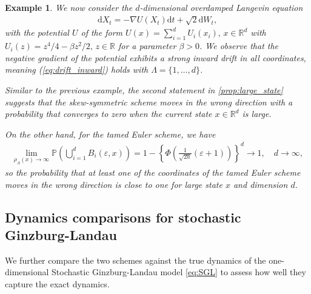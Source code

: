\documentclass[11pt]{article}
\newtheorem{example}{Example}
\renewcommand{\d}{\mathrm{d}}
\begin{document}
\begin{example}
We now consider the $d$-dimensional \emph{overdamped Langevin equation}
% 
\begin{align*}
\d X_t = - \nabla U (X_t) \d t + \sqrt{2} \d W_t,  
\end{align*}
% 
with the potential $U$ of the form $U(x) = \sum_{i = 1}^d U_i (x_i), \, x \in \mathbb{R}^d$ with $U_i (z) = z^4/4 - \beta z^2/2, \, z \in \mathbb{R}$ for a parameter $\beta > 0$. We observe that the negative gradient of the potential exhibits a strong inward drift in all coordinates, meaning (\ref{eq:drift_inward}) holds with $\Lambda = \{1, \ldots, d\}$. 

Similar to the previous example, the second statement in \cref{prop:large_state} suggests that the skew-symmetric scheme moves in the wrong direction with a probability that converges to zero when the current state $x \in \mathbb{R}^d$ is large. 

On the other hand, for the tamed Euler scheme, we have
% 
\begin{align*}
\lim_{\rho_\Lambda (x) \to \infty} \mathbb{P} \left( \bigcup_{i = 1}^d B_i  (\varepsilon, x) \right) = 1 - \left\{ \Phi \left( \frac{1}{\sqrt{2 h}} (\varepsilon + 1) \right) \right\}^d \to 1, \quad d \to \infty, 
\end{align*} 
% 
so the probability that at least one of the coordinates of the tamed Euler scheme moves in the wrong direction is close to one for large state $x$ and dimension $d$. 
\end{example}

\subsection{Dynamics comparisons for stochastic Ginzburg-Landau} 

We further compare the two schemes against the true dynamics of the one-dimensional Stochastic Ginzburg-Landau model \eqref{eq:SGL} to assess how well they capture the exact dynamics. 
\end{document}
